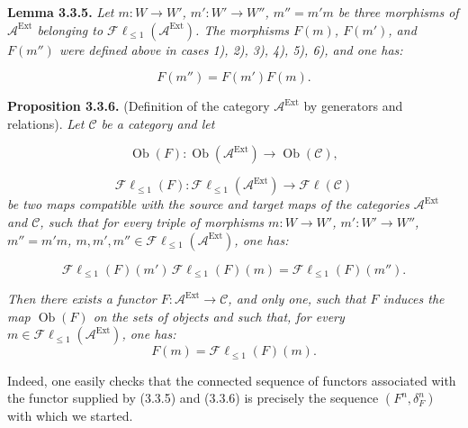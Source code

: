 \clearpage
{}%
\begingroup\small\setlength{\parskip}{0pt}\setlength{\emergencystretch}{1.5em}
\setlength{\abovedisplayskip}{4pt plus 2pt minus 2pt}%
\setlength{\belowdisplayskip}{4pt plus 2pt minus 2pt}%

\medskip\noindent\textbf{Lemma 3.3.5.}\quad
\textit{Let $m\colon W\longrightarrow W'$, $m'\colon W'\longrightarrow W''$,
$m''=m'm$ be three morphisms of $\mathcal A^{\operatorname{Ext}}$ belonging
to $\mathcal F\ell_{\leq 1}(\mathcal A^{\operatorname{Ext}})$. The morphisms
$F(m)$, $F(m')$, and $F(m'')$ were defined above in cases 1), 2), 3), 4),
5), 6), and one has:}

\begin{equation}
F(m'')=F(m')F(m).
\tag{3.3.5.1}
\end{equation}

\medskip\noindent\textbf{Proposition 3.3.6.}\quad
(Definition of the category $\mathcal A^{\operatorname{Ext}}$ by generators
and relations). \textit{Let $\mathcal C$ be a category and let}

\[
\operatorname{Ob}(F)\colon
\operatorname{Ob}(\mathcal A^{\operatorname{Ext}})
\longrightarrow \operatorname{Ob}(\mathcal C),
\]

\[
\mathcal F\ell_{\leq 1}(F)\colon
\mathcal F\ell_{\leq 1}(\mathcal A^{\operatorname{Ext}})
\longrightarrow \mathcal F\ell(\mathcal C)
\]
\textit{be two maps compatible with the source and target maps of the
categories $\mathcal A^{\operatorname{Ext}}$ and $\mathcal C$, such that for
every triple of morphisms $m\colon W\longrightarrow W'$,
$m'\colon W'\longrightarrow W''$, $m''=m'm$,
$m,m',m''\in\mathcal F\ell_{\leq 1}(\mathcal A^{\operatorname{Ext}})$,
one has:}

\[
\mathcal F\ell_{\leq 1}(F)(m')\,
\mathcal F\ell_{\leq 1}(F)(m)
=\mathcal F\ell_{\leq 1}(F)(m'').
\]

\textit{Then there exists a functor
$F\colon\mathcal A^{\operatorname{Ext}}\longrightarrow\mathcal C$, and only
one, such that $F$ induces the map $\operatorname{Ob}(F)$ on the sets of objects and such that,
for every $m\in\mathcal F\ell_{\leq 1}(\mathcal A^{\operatorname{Ext}})$,
one has:}
\[
F(m)=\mathcal F\ell_{\leq 1}(F)(m).
\]

Indeed, one easily checks that the connected sequence of functors associated with
the functor supplied by (3.3.5) and (3.3.6) is precisely the sequence
$(F^n,\delta_F^n)$ with which we started.

